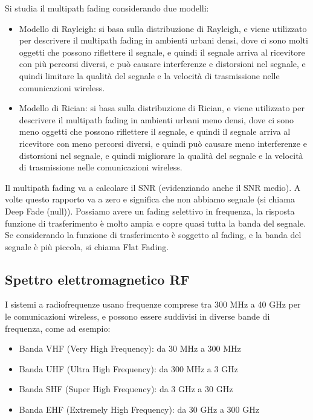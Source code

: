 Si studia il multipath fading considerando due modelli:
\begin{itemize}
    \item Modello di Rayleigh: si basa sulla distribuzione di Rayleigh, e viene utilizzato per descrivere il multipath fading in ambienti urbani densi, dove ci sono molti oggetti che possono riflettere il segnale, e quindi il segnale arriva al ricevitore con più percorsi diversi, e può causare interferenze e distorsioni nel segnale, e quindi limitare la qualità del segnale e la velocità di trasmissione nelle comunicazioni wireless.\\
    \item Modello di Rician: si basa sulla distribuzione di Rician, e viene utilizzato per descrivere il multipath fading in ambienti urbani meno densi, dove ci sono meno oggetti che possono riflettere il segnale, e quindi il segnale arriva al ricevitore con meno percorsi diversi, e quindi può causare meno interferenze e distorsioni nel segnale, e quindi migliorare la qualità del segnale e la velocità di trasmissione nelle comunicazioni wireless.\\
\end{itemize}

Il multipath fading va a calcolare il SNR (evidenziando anche il SNR medio). A volte questo rapporto va a zero e significa che non abbiamo segnale (si chiama Deep Fade (null)). Possiamo avere un fading selettivo in frequenza, la risposta funzione di trasferimento è molto ampia e copre quasi tutta la banda del segnale.
Se considerando la funzione di trasferimento è soggetto al fading, e la banda del segnale è più piccola, si chiama Flat Fading.\\
\subsection{Spettro elettromagnetico RF}

I sistemi a radiofrequenze usano frequenze comprese tra 300 MHz a 40 GHz per le comunicazioni wireless, e possono essere suddivisi in diverse bande di frequenza, come ad esempio:
\begin{itemize}
    \item Banda VHF (Very High Frequency): da 30 MHz a 300 MHz
    \item Banda UHF (Ultra High Frequency): da 300 MHz a 3 GHz
    \item Banda SHF (Super High Frequency): da 3 GHz a 30 GHz
    \item Banda EHF (Extremely High Frequency): da 30 GHz a 300 GHz
\end{itemize}

